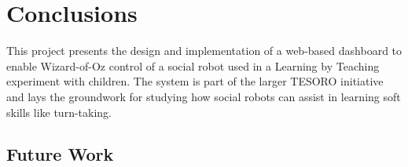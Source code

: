 \documentclass[a4paper]{usiinfbachelorproject}
\begin{document}
\newpage

\section{\textbf{Conclusions}}\label{sec:conclusions}
This project presents the design and implementation of a web-based dashboard to enable Wizard-of-Oz control of a social robot used in a Learning by Teaching experiment with children. The system is part of the larger TESORO initiative and lays the groundwork for studying how social robots can assist in learning soft skills like turn-taking.

\subsection{\textbf{Future Work}}




\end{document}
